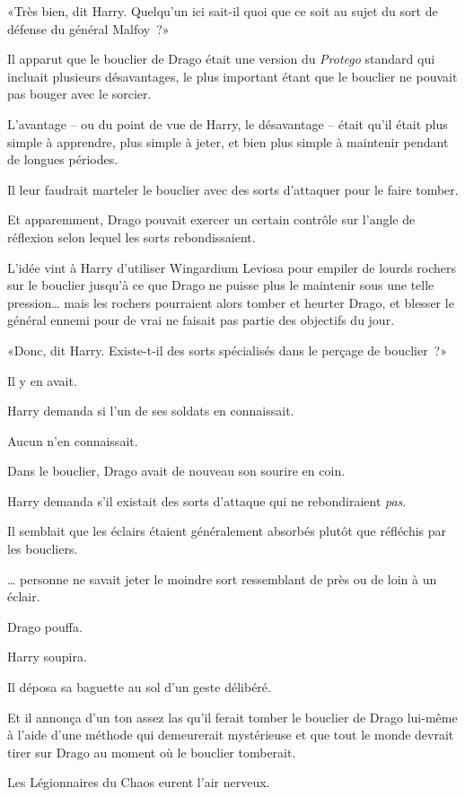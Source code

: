 «Très bien, dit Harry. Quelqu'un ici sait-il quoi que ce soit au sujet du sort de défense du général Malfoy~?»

Il apparut que le bouclier de Drago était une version du \emph{Protego} standard qui incluait plusieurs désavantages, le plus important étant que le bouclier ne pouvait pas bouger avec le sorcier.

L'avantage -- ou du point de vue de Harry, le désavantage -- était qu'il était plus simple à apprendre, plus simple à jeter, et bien plus simple à maintenir pendant de longues périodes.

Il leur faudrait marteler le bouclier avec des sorts d'attaquer pour le faire tomber.

Et apparemment, Drago pouvait exercer un certain contrôle sur l'angle de réflexion selon lequel les sorts rebondissaient.

L'idée vint à Harry d'utiliser Wingardium Leviosa pour empiler de lourds rochers sur le bouclier jusqu'à ce que Drago ne puisse plus le maintenir sous une telle pression… mais les rochers pourraient alors tomber et heurter Drago, et blesser le général ennemi pour de vrai ne faisait pas partie des objectifs du jour.

«Donc, dit Harry. Existe-t-il des sorts spécialisés dans le perçage de bouclier~?»

Il y en avait.

Harry demanda si l'un de ses soldats en connaissait.

Aucun n'en connaissait.

Dans le bouclier, Drago avait de nouveau son sourire en coin.

Harry demanda s'il existait des sorts d'attaque qui ne rebondiraient \emph{pas}.

Il semblait que les éclairs étaient généralement absorbés plutôt que réfléchis par les boucliers.

… personne ne savait jeter le moindre sort ressemblant de près ou de loin à un éclair.

Drago pouffa.

Harry soupira.

Il déposa sa baguette au sol d'un geste délibéré.

Et il annonça d'un ton assez las qu'il ferait tomber le bouclier de Drago lui-même à l'aide d'une méthode qui demeurerait mystérieuse et que tout le monde devrait tirer sur Drago au moment où le bouclier tomberait.

Les Légionnaires du Chaos eurent l'air nerveux.

